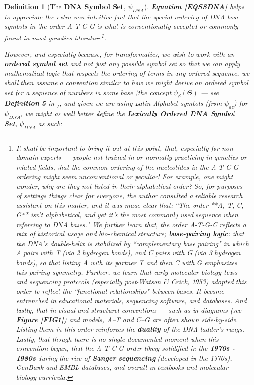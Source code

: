 \documentclass[a4paper, 18pt]{book} %
\newtheorem{defn}{Definition}
\begin{document}
{\begin{minipage}{0.9\textwidth}
\begin{defn}[The \textbf{DNA Symbol Set}, $\psi_{DNA}$]
\textbf{Equation \ref{EQSSDNA}} helps to appreciate the extra non-intuitive fact that the special ordering of DNA base symbols in the order A-T-C-G is what is conventionally accepted\cite{nature_atcg}\cite{wikipedia_nucleic_acid} or commonly found in most genetics literature\footnote{It shall be important to bring it out at this point, that, especially for non-domain experts --- people not trained in or normally practicing in genetics or related fields, that the common ordering of the nucleotides in the A-T-C-G ordering might seem unconventional or peculiar! For example, one might wonder, why are they not listed in their alphabetical order? So, for purposes of settings things clear for everyone, the author consulted a reliable research assistant on this matter\cite{copilot_dna_assistant}, and it was made clear that: ``The order **A, T, C, G** isn't alphabetical, and yet it's the most commonly used sequence when referring to DNA bases." We further learn that, the order A-T-G-C reflects a mix of historical usage and bio-chemical structure; \textbf{base-pairing logic}: that the DNA's double-helix is stabilized by ``complementary base pairing" in which A pairs with T (via 2 hydrogen bonds), and C pairs with G (via 3 hydrogen bonds), so that listing A with its partner T and then C with G emphasizes this pairing symmetry\cite{copilot_dna_assistant}. Further, we learn that early molecular biology texts and sequencing protocols (especially post-Watson \& Crick, 1953) adopted this order to reflect the ``functional relationships" between bases. It became entrenched in educational materials, sequencing software, and databases. And lastly, that in visual and structural conventions --- such as in diagrams (see \textbf{Figure \ref{FIG1}}) and models, A–T and C–G are often shown side-by-side. Listing them in this order reinforces the \textbf{duality} of the DNA ladder's rungs\cite{copilot_dna_assistant}. Lastly, that though there is no single documented moment when this convention begun, that the A-T-C-G order likely solidified in the \textbf{1970s - 1980s} during the rise of \textbf{Sanger sequencing} (developed in the 1970s), GenBank and EMBL databases, and overall in textbooks and molecular biology curricula.}.

However, and especially because, for transformatics, we wish to work with an \textbf{ordered symbol set}\cite{ossipaper} and not just \textit{any possible symbol set} so that we can apply mathematical logic that respects the ordering of terms in any ordered sequence\cite{transformatics}, we shall then assume a convention similar to how we might derive an ordered symbol set for a sequence of numbers in some base (the concept $\psi_\beta(\Theta)$ --- see \textbf{Definition 5} in \cite{ossipaper}), and given we are using Latin-Alphabet symbols (from $\psi_{az}$\cite{transformatics}) for $\psi_{DNA}$, we might as well better define the \textbf{Lexically Ordered DNA Symbol Set}, $\psi_{DNA}$ as such:


\end{defn}
\end{minipage}}
\end{document}
